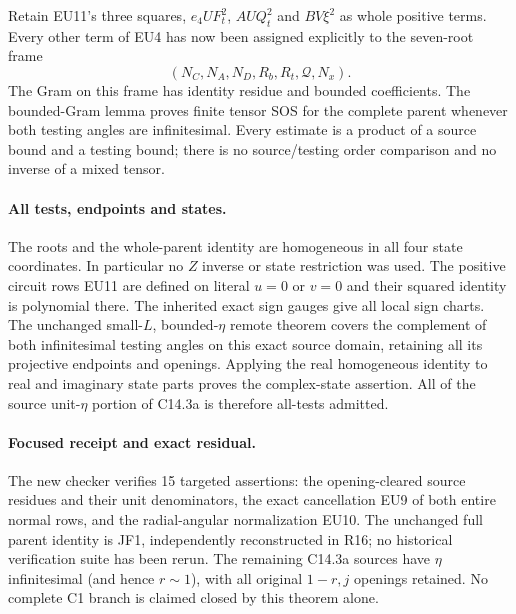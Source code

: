 Retain EU11's three squares, $e_4UF_t^2$, $AUQ_t^2$ and
$BV\xi^2$ as whole positive terms. Every other term of EU4 has now
been assigned explicitly to the seven-root frame
\[
                 (N_C,N_A,N_D,R_b,R_t,\mathcal Q,N_x).             \tag{EU12}
\]
The Gram on this frame has identity residue and bounded coefficients.
The bounded-Gram lemma proves finite tensor SOS for the complete
parent whenever both testing angles are infinitesimal. Every estimate
is a product of a source bound and a testing bound; there is no
source/testing order comparison and no inverse of a mixed tensor.

\paragraph{All tests, endpoints and states.}
The roots and the whole-parent identity are homogeneous in all four
state coordinates. In particular no $Z$ inverse or state restriction
was used. The positive circuit rows EU11 are defined on literal
$u=0$ or $v=0$ and their squared identity is polynomial there.
The inherited exact sign gauges give all local sign charts.
The unchanged small-$L$, bounded-$\eta$ remote theorem covers the
complement of both infinitesimal testing angles on this exact source
domain, retaining all its projective endpoints and openings.
Applying the real homogeneous identity to real and imaginary state
parts proves the complex-state assertion. All of the source unit-$\eta$
portion of C14.3a is therefore all-tests admitted.

\paragraph{Focused receipt and exact residual.}
The new checker  verifies
15 targeted assertions: the opening-cleared source residues and their
unit denominators, the exact cancellation EU9 of both entire normal
rows, and the radial-angular normalization EU10. The unchanged full
parent identity is JF1, independently reconstructed in R16;
no historical verification suite has been rerun.
The remaining C14.3a sources have $\eta$ infinitesimal (and hence
$r\sim1$), with all original $1-r,j$ openings retained. No complete
C1 branch is claimed closed by this theorem alone.
